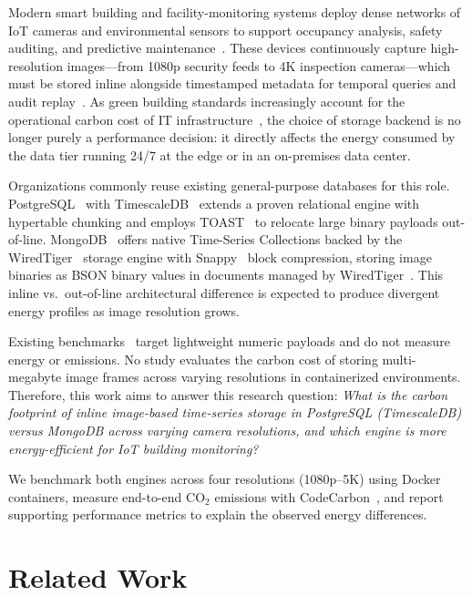 \documentclass[conference]{IEEEtran}
\begin{document}
Modern smart building and facility-monitoring systems deploy dense networks of IoT cameras and environmental sensors to support occupancy analysis, safety auditing, and predictive maintenance~\cite{bajera_iot_smart_buildings,alfuqaha_iot_survey}. These devices continuously capture high-resolution images---from 1080p security feeds to 4K inspection cameras---which must be stored inline alongside timestamped metadata for temporal queries and audit replay~\cite{ceec_tsdb_review,jensen_tsms_survey}. As green building standards increasingly account for the operational carbon cost of IT infrastructure~\cite{nerc_tsdb_survey}, the choice of storage backend is no longer purely a performance decision: it directly affects the energy consumed by the data tier running 24/7 at the edge or in an on-premises data center.

Organizations commonly reuse existing general-purpose databases for this role. PostgreSQL~\cite{postgresql_official} with TimescaleDB~\cite{timescaledb_official} extends a proven relational engine with hypertable chunking and employs TOAST~\cite{postgresql_toast_docs} to relocate large binary payloads out-of-line. MongoDB~\cite{mongodb_official} offers native Time-Series Collections backed by the WiredTiger~\cite{mongodb_wiredtiger_storage} storage engine with Snappy~\cite{google_snappy} block compression, storing image binaries as BSON binary values in documents managed by WiredTiger~\cite{mongodb_bson_spec,mongodb_wiredtiger_storage}. This inline vs.\ out-of-line architectural difference is expected to produce divergent energy profiles as image resolution grows.

Existing benchmarks~\cite{tsbs,cratedb_ts_benchmark,diva_timescaledb_mongodb_eval} target lightweight numeric payloads and do not measure energy or emissions. No study evaluates the carbon cost of storing multi-megabyte image frames across varying resolutions in containerized environments. Therefore, this work aims to answer this research question: \textit{What is the carbon footprint of inline image-based time-series storage in PostgreSQL (TimescaleDB) versus MongoDB across varying camera resolutions, and which engine is more energy-efficient for IoT building monitoring?}

We benchmark both engines across four resolutions (1080p--5K) using Docker containers, measure end-to-end CO$_2$ emissions with CodeCarbon~\cite{codecarbon}, and report supporting performance metrics to explain the observed energy differences.

\section{Related Work}
\label{sec:related_work}
\end{document}

